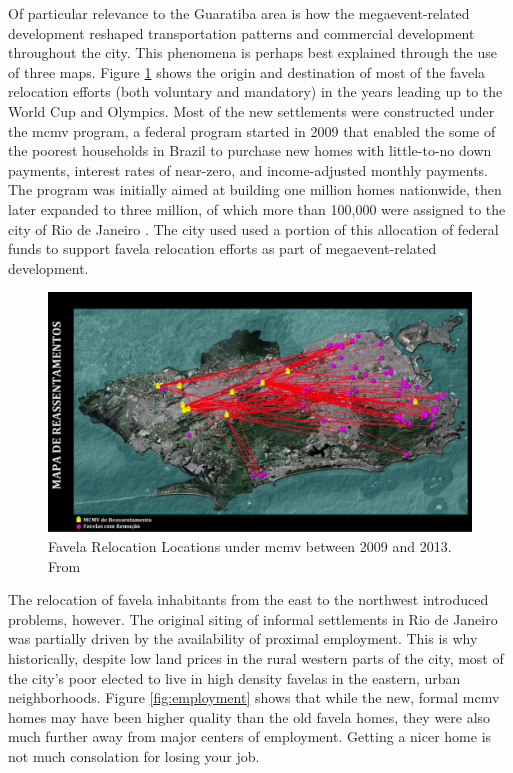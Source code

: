 Of particular relevance to the Guaratiba area is how the megaevent-related development reshaped transportation patterns and commercial development throughout the city. This phenomena is perhaps best explained through the use of three maps. Figure \ref{fig:relocation} shows the origin and destination of most of the favela relocation efforts (both voluntary and mandatory) in the years leading up to the World Cup and Olympics. Most of the new settlements were constructed under the \ac{mcmv} program, a federal program started in 2009 that enabled the some of the poorest households in Brazil to purchase new homes with little-to-no down payments, interest rates of near-zero, and income-adjusted monthly payments. The program was initially aimed at building one million homes nationwide, then later expanded to three million, of which more than 100,000 were assigned to the city of Rio de Janeiro \cite{nadalMinhaCasaMinha2018}. The city used used a portion of this allocation of federal funds to support favela relocation efforts as part of megaevent-related development.

\begin{figure}[!htb]
	\centering
	\includegraphics[scale=0.3]{Figures/chap4/Relocation.png}
	\caption[Favela Relocation Locations under MCMV between 2009 and 2013]{Favela Relocation Locations under \ac{mcmv} between 2009 and 2013. From \cite{faulhaberRioMaravilhaProjetos2012}}
	\label{fig:relocation}
\end{figure}

The relocation of favela inhabitants from the east to the northwest introduced problems, however. The original siting of informal settlements in Rio de Janeiro was partially driven by the availability of proximal employment. This is why historically, despite low land prices in the rural western parts of the city, most of the city's poor elected to live in high density favelas in the eastern, urban neighborhoods. Figure \ref{fig:employment} shows that while the new, formal \ac{mcmv} homes may have been higher quality than the old favela homes, they were also much further away from major centers of employment. Getting a nicer home is not much consolation for losing your job. 

